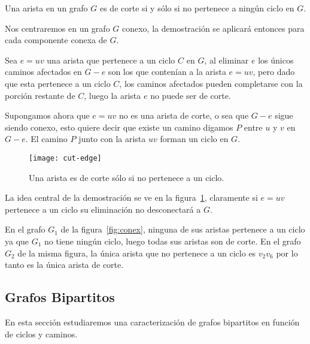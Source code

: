 \begin{teorema}\label{teo:cut-edge}
Una arista en un grafo $G$ es de corte si y sólo si no pertenece a ningún ciclo en $G$.

\begin{demostracion}
Nos centraremos en un grafo $G$ conexo, la demostración se aplicará entonces para cada componente conexa de $G$.

Sea $e=uv$ una arista que pertenece a un ciclo $C$ en $G$, al eliminar $e$ los únicos caminos afectados en $G-e$ son los que contenían a la arista $e=uv$, pero dado que esta pertenece a un ciclo $C$, los caminos afectados pueden completarse con la porción restante de $C$, luego la arista $e$ no puede ser de corte.

Supongamos ahora que $e=uv$ no es una arista de corte, o sea que $G-e$ sigue siendo conexo, esto quiere decir que existe un camino digamos $P$ entre $u$ y $v$ en $G-e$.
El camino $P$ junto con la arista $uv$ forman un ciclo en $G$.

\begin{figure}[h!]
\centering
\hspace*{6em}\texttt{[image: cut-edge]}
\caption{Una arista es de corte sólo si no pertenece a un ciclo.}
\label{fig:cut-edge}
\end{figure}
La idea central de la demostración se ve en la figura~\ref{fig:cut-edge}, claramente si $e=uv$ pertenece a un ciclo su eliminación no desconectará a $G$.
\end{demostracion}
\end{teorema}

\begin{ejemplo}
En el grafo $G_1$ de la figura~\ref{fig:conex}, ninguna de sus aristas pertenece a un ciclo ya que $G_1$ no tiene ningún ciclo, luego todas sus aristas son de corte.
En el grafo $G_2$ de la misma figura, la única arista que no pertenece a un ciclo es $v_2v_6$ por lo tanto es la única arista de corte.
\end{ejemplo}


\subsection{Grafos Bipartitos}
En esta sección estudiaremos una caracterización de grafos bipartitos en función de ciclos y caminos.

